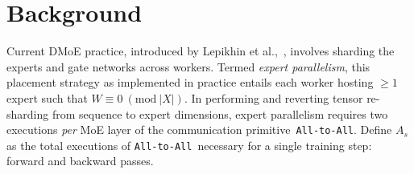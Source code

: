 
\section{Background}\label{sec:Background}
Current DMoE practice, introduced by Lepikhin et al.,~\cite{DBLP:journals/corr/abs-2006-16668},
involves sharding the experts and gate networks across workers.
Termed \emph{expert parallelism}, this placement strategy as implemented in practice entails
each worker hosting $\geq 1$ expert such that $W \equiv 0 \: (\mathrm{mod \:} |X|)$.
In performing and reverting tensor re-sharding from sequence to expert dimensions,
expert parallelism requires two executions \emph{per} MoE layer of the communication primitive~\verb|All-to-All|.
Define $A_s$ as the total executions of \verb|All-to-All|~necessary
for a single training step: forward and backward passes.
